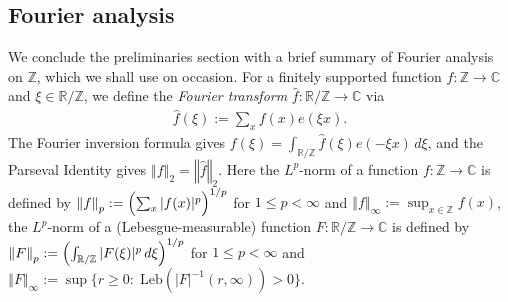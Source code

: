 \documentclass[11pt]{amsart}
\theoremstyle{definition}
\newcommand{\C}{{\mathbb C}}
\newcommand{\R}{{\mathbb R}}
\newcommand{\Z}{{\mathbb Z}}
\newcommand{\norm}[1]{\left\Vert #1\right\Vert}
\newcommand{\Bigbrac}[1]{\Bigl( #1 \Bigr)}
\begin{document}
\subsection{Fourier analysis}
We conclude the preliminaries section with a brief summary of Fourier analysis on $\Z$, which we shall use on occasion. For a finitely supported function $f:\Z\to\C$ and $\xi\in\R/\Z$, we define the \emph{Fourier transform} $\hat f: \R/\Z \to \C$ via
\begin{align*}
    \hat{f}(\xi):= \sum_x f(x)e(\xi x).
\end{align*}
The Fourier inversion formula gives $f(\xi) = \int_{\R/\Z} \hat{f}(\xi)e(-\xi x)\, d\xi$, and the Parseval Identity gives $\norm{f}_2 = \norm{\hat{f}}_2$.  Here the $L^p$-norm of a function $f:\Z\to\C$ is defined by $\norm{f}_p:= \Bigbrac{\sum_x |f(x)|^p}^{1/p}$ for $1\leq p<\infty$ and $\norm{f}_\infty :=\sup_{x\in\Z}f(x)$, the $L^p$-norm of a (Lebesgue-measurable) function $F:\R/\Z\to\C$ is defined by $\norm{F}_p:= \Bigbrac{\int_{\R/\Z}|F(\xi)|^p\, d\xi}^{1/p}$ for $1\leq p<\infty$ and $\norm{F}_\infty :=\sup\{r\geq 0:\; \mathrm{Leb}(|F|^{-1}(r,\infty))>0\}$.
\end{document}
